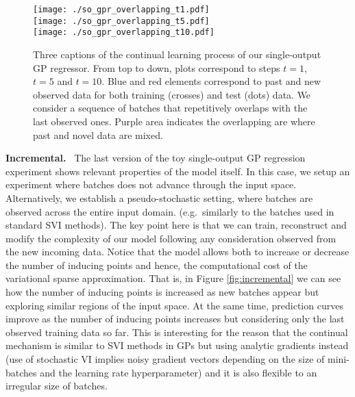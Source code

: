 \documentclass[]{article}
\begin{document}
\begin{figure}[] \centering
	\texttt{[image: ./so\_gpr\_overlapping\_t1.pdf]}\\
	\vspace{0.1cm}
	\texttt{[image: ./so\_gpr\_overlapping\_t5.pdf]}\\
	\vspace{0.1cm}
	\texttt{[image: ./so\_gpr\_overlapping\_t10.pdf]}
	\caption{Three captions of the continual learning process of our single-output GP regressor. From top to down, plots correspond to steps $t=1$, $t=5$ and $t=10$. Blue and red elements correspond to past and new observed data for both training  (crosses) and test (dots) data. We consider a sequence of batches that repetitively overlaps with the last observed ones. Purple area indicates the overlapping are where past and novel data are mixed.}
	\label{fig:overlapping}
\end{figure}

\textbf{Incremental.}~ The last version of the toy single-output GP regression experiment shows relevant properties of the model itself. In this case, we setup an experiment where batches does not advance through the input space. Alternatively, we establish a pseudo-stochastic setting, where batches are observed across the entire input domain. (e.g.\ similarly to the batches used in standard SVI methods). The key point here is that we can train, reconstruct and modify the complexity of our model following any consideration observed from the new incoming data. Notice that the model allows both to increase or decrease the number of inducing points and hence, the computational cost of the variational sparse approximation. That is, in Figure \ref{fig:incremental} we can see how the number of inducing points is increased as new batches appear but exploring similar regions of the input space. At the same time, prediction curves improve as the number of inducing points increases but considering only the last observed training data so far. This is interesting for the reason that the continual mechanism is similar to SVI methods in GPs but using analytic gradients instead (use of stochastic VI implies noisy gradient vectors depending on the size of mini-batches and the learning rate hyperparameter) and it is also flexible to an irregular size of batches.
\end{document}
